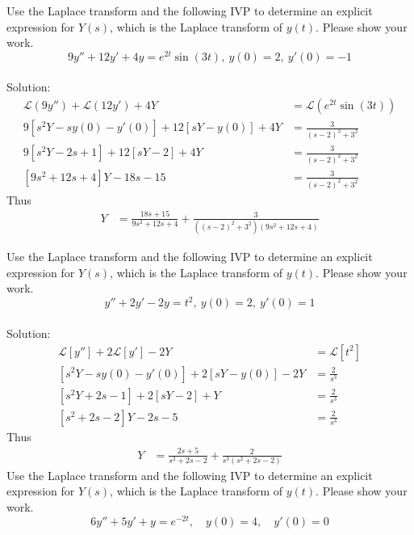 \ifnum {}
    \question[6] Use the Laplace transform and the following IVP to determine an explicit expression for $Y(s)$, which is the Laplace transform of $y(t)$. Please show your work. 
    $$9y''+ 12y' + 4y = e^{2t}\sin(3t), \ y(0) = 2, \ y'(0) = -1$$
    \ifnum {} {\color{DarkBlue} \\ Solution:
    \begin{align}
        \mathcal L(9y'') + \mathcal L(12y')+4Y &= \mathcal{L}(e^{2t}\sin(3t))\\ 
        9[s^2 Y - sy(0) - y'(0)]+12[sY - y(0)]+4Y &= \frac{3}{(s-2)^2+3^2} \\
        9[s^2 Y - 2s + 1] + 12[sY - 2] + 4Y &= \frac{3}{(s-2)^2+3^2} \\
        [9s^2 + 12s + 4]Y  -  18s  -  15 &= \frac{3}{(s-2)^2+3^2} 
    \end{align}
    Thus 
    \begin{align}
        Y &= \frac{18s + 15}{9s^2 + 12s + 4} +  \frac{3}{((s-2)^2+3^2)(9s^2 + 12s + 4)}
    \end{align}        
    } 
    \else 
    \vfill
    \fi         
\fi

\ifnum {}
    \question[6] Use the Laplace transform and the following IVP to determine an explicit expression for $Y(s)$, which is the Laplace transform of $y(t)$. Please show your work. 
    $$y''+ 2y' - 2y = t^2, \ y(0) = 2, \ y'(0) = 1$$
    \ifnum {} {\color{DarkBlue} \\ Solution:
    \begin{align}
        \mathcal L[y''] + 2\mathcal L[y']-2Y &= \mathcal{L}[t^2]\\ 
        [s^2 Y - sy(0) - y'(0)]+2[sY - y(0)]-2Y &= \frac{2}{s^3} \\
        [s^2 Y + 2s - 1] + 2[sY - 2] + Y &=  \frac{2}{s^3}\\
        [s^2 + 2s -2]Y  -  2s  -  5 &=  \frac{2}{s^3}
    \end{align}
    Thus 
    \begin{align}
        Y &= \frac{2s + 5}{s^2 + 2s - 2} +  \frac{2}{s^3(s^2 + 2s - 2)}
    \end{align}        
    } 
    \else 
    \vfill
    \fi         
\fi
\ifnum {}
    \question[6] Use the Laplace transform and the following IVP to determine an explicit expression for $Y(s)$, which is the Laplace transform of $y(t)$. Please show your work. 
    $$6y'' + 5y' + y = e^{-2t}, \quad y(0) = 4, \quad y'(0) = 0$$
        
